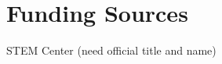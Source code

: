 \documentclass[final,1p, times, twocolumn]{elsarticle}
\begin{document}
\section{Funding Sources}
\label{funding}
STEM Center (need official title and name)






\end{document}
